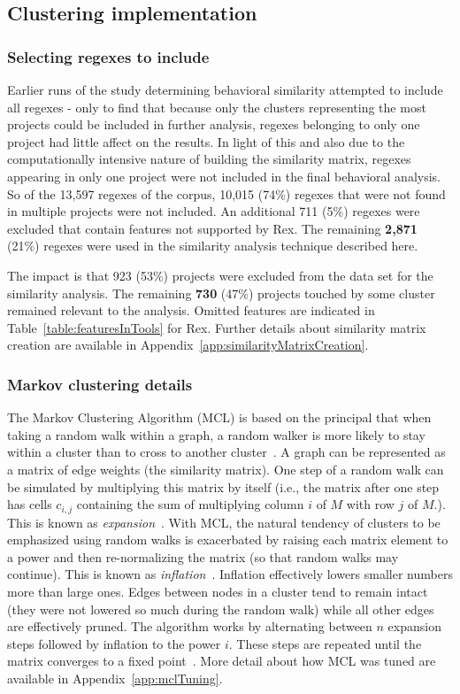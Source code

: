 \subsection{Clustering implementation}

\subsubsection{Selecting regexes to include}
Earlier runs of the study determining behavioral similarity attempted to include all regexes - only to find that because only the clusters representing the most projects could be included in further analysis, regexes belonging to only one project had little affect on the results. In light of this and also due to the computationally intensive nature of building the similarity matrix, regexes appearing in only one project were not included in the final behavioral analysis.  So of the 13,597 regexes of the corpus, 10,015 (74\%) regexes that were not found in multiple projects were not included.
An additional 711 (5\%) regexes were excluded that contain features not supported by Rex.  The remaining \textbf{2,871} (21\%) regexes were used in the similarity analysis technique described here.

The impact is that 923 (53\%) projects were excluded from the data set for the similarity analysis.  The remaining \textbf{730} (47\%) projects touched by some cluster remained relevant to the analysis. Omitted features are indicated in Table~\ref{table:featuresInTools} for Rex.  Further details about similarity matrix creation are available in Appendix~\ref{app:similarityMatrixCreation}.

\subsubsection{Markov clustering details}
The Markov Clustering Algorithm (MCL) is based on the principal that when taking a random walk within a graph, a random walker is more likely to stay within a cluster than to cross to another cluster~.  A graph can be represented as a matrix of edge weights (the similarity matrix).  One step of a random walk can be simulated by multiplying this matrix by itself (i.e., the matrix after one step has cells $c_{i,j}$ containing the sum of multiplying column $i$ of $M$ with row $j$ of $M$.).  This is known as \emph{expansion}~.  With MCL, the natural tendency of clusters to be emphasized using random walks is exacerbated by raising each matrix element to a power and then re-normalizing the matrix (so that random walks may continue).  This is known as \emph{inflation}~.  Inflation effectively lowers smaller numbers more than large ones.  Edges between nodes in a cluster tend to remain intact (they were not lowered so much during the random walk) while all other edges are effectively pruned.  The algorithm works by alternating between $n$ expansion steps followed by inflation to the power $i$.  These steps are repeated until the matrix converges to a fixed point~.  More detail about how MCL was tuned are available in Appendix~\ref{app:mclTuning}.
